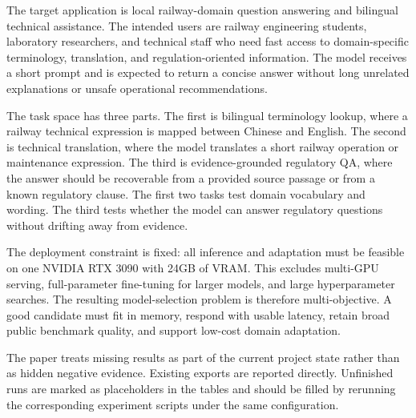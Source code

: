 \label{sec:problem_setting}

The target application is local railway-domain question answering and bilingual
technical assistance. The intended users are railway engineering students,
laboratory researchers, and technical staff who need fast access to
domain-specific terminology, translation, and regulation-oriented information.
The model receives a short prompt and is expected to return a concise answer
without long unrelated explanations or unsafe operational recommendations.

The task space has three parts. The first is bilingual terminology lookup,
where a railway technical expression is mapped between Chinese and English. The
second is technical translation, where the model translates a short railway
operation or maintenance expression. The third is evidence-grounded regulatory
QA, where the answer should be recoverable from a provided source passage or
from a known regulatory clause. The first two tasks test domain vocabulary and
wording. The third tests whether the model can answer regulatory questions
without drifting away from evidence.

The deployment constraint is fixed: all inference and adaptation must be
feasible on one NVIDIA RTX 3090 with 24GB of VRAM. This excludes multi-GPU
serving, full-parameter fine-tuning for larger models, and large
hyperparameter searches. The resulting model-selection problem is therefore
multi-objective. A good candidate must fit in memory, respond with usable
latency, retain broad public benchmark quality, and support low-cost domain
adaptation.

The paper treats missing results as part of the current project state rather
than as hidden negative evidence. Existing exports are reported directly.
Unfinished runs are marked as placeholders in the tables and should be filled
by rerunning the corresponding experiment scripts under the same configuration.
